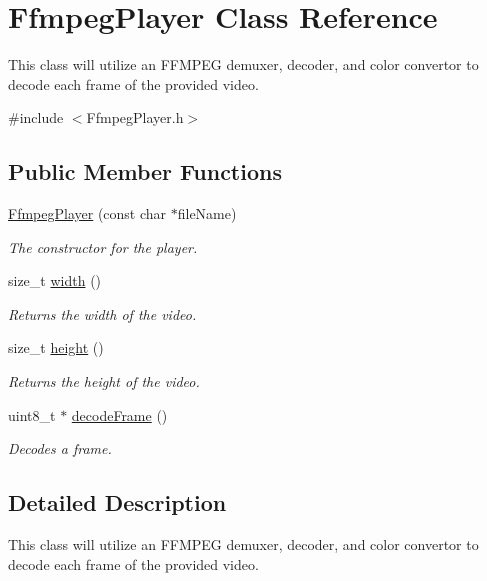 \hypertarget{class_ffmpeg_player}{
\section{FfmpegPlayer Class Reference}
\label{class_ffmpeg_player}
}


This class will utilize an FFMPEG demuxer, decoder, and color convertor to decode each frame of the provided video.  




{\ttfamily \#include $<$FfmpegPlayer.h$>$}

\subsection*{Public Member Functions}
\begin{DoxyCompactItemize}
\item 
\hyperlink{class_ffmpeg_player_a3b1d216b36dc588488692de78c1ba55e}{FfmpegPlayer} (const char $\ast$fileName)
\begin{DoxyCompactList}\small\item\em The constructor for the player. \item\end{DoxyCompactList}\item 
size\_\-t \hyperlink{class_ffmpeg_player_a0b3cf0e40a65cb9d11d33bf6b5731789}{width} ()
\begin{DoxyCompactList}\small\item\em Returns the width of the video. \item\end{DoxyCompactList}\item 
size\_\-t \hyperlink{class_ffmpeg_player_ad90e8e932600ad2333ed0861e1370507}{height} ()
\begin{DoxyCompactList}\small\item\em Returns the height of the video. \item\end{DoxyCompactList}\item 
uint8\_\-t $\ast$ \hyperlink{class_ffmpeg_player_a4d8b583fc2b17e80f7d1c1183f38652f}{decodeFrame} ()
\begin{DoxyCompactList}\small\item\em Decodes a frame. \item\end{DoxyCompactList}\end{DoxyCompactItemize}


\subsection{Detailed Description}
This class will utilize an FFMPEG demuxer, decoder, and color convertor to decode each frame of the provided video. 

